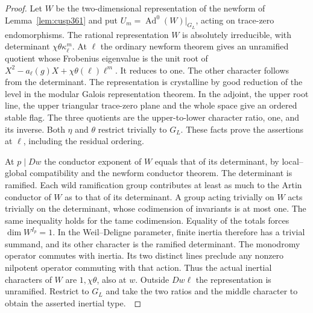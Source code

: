 \documentclass[a4paper,11pt]{article}
\theoremstyle{definition}
\theoremstyle{remark}
\numberwithin{equation}{section}
\begin{document}
\begin{proof}
Let \(W\) be the two-dimensional representation of the newform of
Lemma~\ref{lem:cusp361} and put
\(U_m=\operatorname{Ad}^0(W)|_{G_L}\), acting on trace-zero
endomorphisms. The rational representation \(W\) is absolutely
irreducible, with determinant \(\chi\theta\kappa_\ell^m\).
At \(\ell\) the ordinary newform theorem gives an unramified
quotient whose Frobenius eigenvalue is the unit root of
\(X^2-a_\ell(g)X+\chi\theta(\ell)\ell^m\). It reduces to one.
The other character follows from the determinant. The
representation is crystalline by good reduction of the level
in the modular Galois representation theorem. In the adjoint,
the upper root line, the upper triangular trace-zero plane and the
whole space give an ordered stable flag. The three quotients are
the upper-to-lower character ratio, one, and its inverse.
Both \(\eta\) and \(\theta\) restrict trivially to \(G_L\).
These facts prove the assertions at \(\ell\), including the
residual ordering.~\cite{VII-V-ordinary361,VII-V-VI-saito40}

At \(p\mid Dw\) the conductor exponent of \(W\) equals that
of its determinant, by local--global compatibility and the newform
conductor theorem. The determinant is ramified. Each wild
ramification group contributes at least as much to the Artin
conductor of \(W\) as to that of its determinant. A group acting
trivially on \(W\) acts trivially on the determinant, whose
codimension of invariants is at most one. The same inequality
holds for the tame codimension. Equality of the totals forces
\(\dim W^{I_p}=1\). In the Weil--Deligne parameter, finite
inertia therefore has a trivial summand, and its other character
is the ramified determinant. The monodromy operator commutes
with inertia. Its two distinct lines preclude any nonzero
nilpotent operator commuting with that action. Thus the actual
inertial characters of \(W\) are \(1,\chi\theta\), also at \(w\).
Outside \(Dw\ell\) the representation is unramified. Restrict
to \(G_L\) and take the two ratios and the middle character to
obtain the asserted inertial type.~\cite{VII-V-I-compat123,VII-V-V-newforms}


\end{proof}
\end{document}
